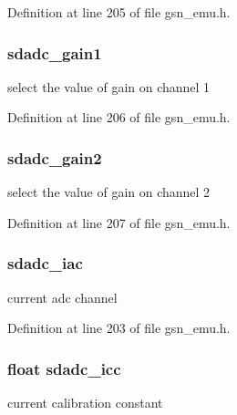 Definition at line 205 of file gsn\_\-emu.h.

\hypertarget{a00058_a382ce5f5e5dc11c6942003e96754970a}{
\subsubsection[{sdadc\_\-gain1}]{ {\bf sdadc\_\-gain1}}}
\label{a00058_a382ce5f5e5dc11c6942003e96754970a}
select the value of gain on channel 1 

Definition at line 206 of file gsn\_\-emu.h.

\hypertarget{a00058_a4ea97943af9d2e5f6e88c7a5312c995f}{
\subsubsection[{sdadc\_\-gain2}]{ {\bf sdadc\_\-gain2}}}
\label{a00058_a4ea97943af9d2e5f6e88c7a5312c995f}
select the value of gain on channel 2 

Definition at line 207 of file gsn\_\-emu.h.

\hypertarget{a00058_a0906728692004de5f899760897844979}{
\subsubsection[{sdadc\_\-iac}]{ {\bf sdadc\_\-iac}}}
\label{a00058_a0906728692004de5f899760897844979}
current adc channel 

Definition at line 203 of file gsn\_\-emu.h.

\hypertarget{a00058_ac612b6ab67ea263b3483813f9b2c9637}{
\subsubsection[{sdadc\_\-icc}]{\setlength{\rightskip}{0pt plus 5cm}float {\bf sdadc\_\-icc}}}
\label{a00058_ac612b6ab67ea263b3483813f9b2c9637}
current calibration constant 

